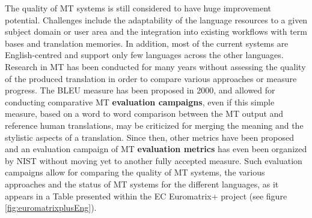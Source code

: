\begin{multicols}{2}
The quality of MT systems is still considered to have huge improvement
potential. Challenges include the adaptability of the language
resources to a given subject domain or user area and the integration
into existing workflows with term bases and translation memories. In
addition, most of the current systems are English-centred and support
only few languages across the other languages. Research in MT has been
conducted for many years without assessing the quality of the produced
translation in order to compare various approaches or measure
progress. The BLEU measure has been proposed in 2000\cite{bleu02}, and allowed for
conducting comparative MT {\bf evaluation campaigns}, even if this simple
measure, based on a word to word comparison between the MT output and
reference human translations, may be criticized for merging the
meaning and the stylistic aspects of a translation. Since then, other
metrics have been proposed and an evaluation campaign of MT {\bf evaluation
metrics} has even been organized by NIST without moving yet to another
fully accepted measure. Such evaluation campaigns allow for comparing
the quality of MT systems, the various approaches and the status of MT
systems for the different languages, as it appears in a Table
presented within the EC Euromatrix+ project (see figure \ref{fig:euromatrixplusEng}).


\end{multicols}
